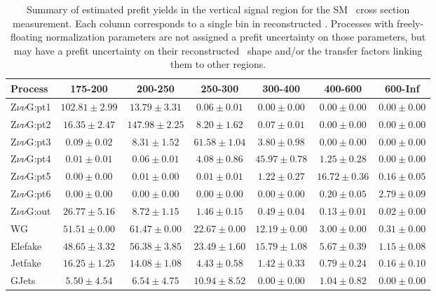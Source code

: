 \begin{table}[htbp]
  \begin{center}
    \caption{Summary of estimated prefit yields in the vertical signal region for the SM \zinvg\ cross section measurement.
    Each column corresponds to a single bin in reconstructed \ETgamma. Processes with freely-floating normalization parameters
    are not assigned a prefit uncertainty on those parameters, but may have a prefit uncertainty on their reconstructed \ETgamma\ shape
    and/or the transfer factors linking them to other regions.}
    \label{tab:BkgSummary_above0p5_prefit}
    \begin{tabular}{|l|c|c|c|c|c|c|}
      \hline
      Process & 175-200 & 200-250 & 250-300 & 300-400 & 400-600 & 600-Inf \\
      \hline
      Z$\nu\nu$G:pt1 & $102.81{\pm}2.99$ & $13.79{\pm}3.31$ & $0.06{\pm}0.01$ & $0.00{\pm}0.00$ & $0.00{\pm}0.00$ & $0.00{\pm}0.00$ \\
      Z$\nu\nu$G:pt2 & $16.35{\pm}2.47$ & $147.98{\pm}2.25$ & $8.20{\pm}1.62$ & $0.07{\pm}0.01$ & $0.00{\pm}0.00$ & $0.00{\pm}0.00$ \\
      Z$\nu\nu$G:pt3 & $0.09{\pm}0.02$ & $8.31{\pm}1.52$ & $61.58{\pm}1.04$ & $3.80{\pm}0.98$ & $0.00{\pm}0.00$ & $0.00{\pm}0.00$ \\
      Z$\nu\nu$G:pt4 & $0.01{\pm}0.01$ & $0.06{\pm}0.01$ & $4.08{\pm}0.86$ & $45.97{\pm}0.78$ & $1.25{\pm}0.28$ & $0.00{\pm}0.00$ \\
      Z$\nu\nu$G:pt5 & $0.00{\pm}0.00$ & $0.01{\pm}0.00$ & $0.01{\pm}0.01$ & $1.22{\pm}0.27$ & $16.72{\pm}0.36$ & $0.16{\pm}0.05$ \\
      Z$\nu\nu$G:pt6 & $0.00{\pm}0.00$ & $0.00{\pm}0.00$ & $0.00{\pm}0.00$ & $0.00{\pm}0.00$ & $0.20{\pm}0.05$ & $2.79{\pm}0.09$ \\
      Z$\nu\nu$G:out & $26.77{\pm}5.16$ & $8.72{\pm}1.15$ & $1.46{\pm}0.15$ & $0.49{\pm}0.04$ & $0.13{\pm}0.01$ & $0.02{\pm}0.00$ \\
      WG & $51.51{\pm}0.00$ & $61.47{\pm}0.00$ & $22.67{\pm}0.00$ & $12.19{\pm}0.00$ & $3.00{\pm}0.00$ & $0.31{\pm}0.00$ \\
      Elefake & $48.65{\pm}3.32$ & $56.38{\pm}3.85$ & $23.49{\pm}1.60$ & $15.79{\pm}1.08$ & $5.67{\pm}0.39$ & $1.15{\pm}0.08$ \\
      Jetfake & $16.25{\pm}1.25$ & $14.08{\pm}1.08$ & $4.43{\pm}0.58$ & $1.42{\pm}0.33$ & $0.79{\pm}0.24$ & $0.16{\pm}0.10$ \\
      GJets & $5.50{\pm}4.54$ & $6.54{\pm}4.75$ & $10.94{\pm}8.52$ & $0.00{\pm}0.00$ & $1.04{\pm}0.82$ & $0.00{\pm}0.00$ \\

\end{tabular}
\end{center}
\end{table}
